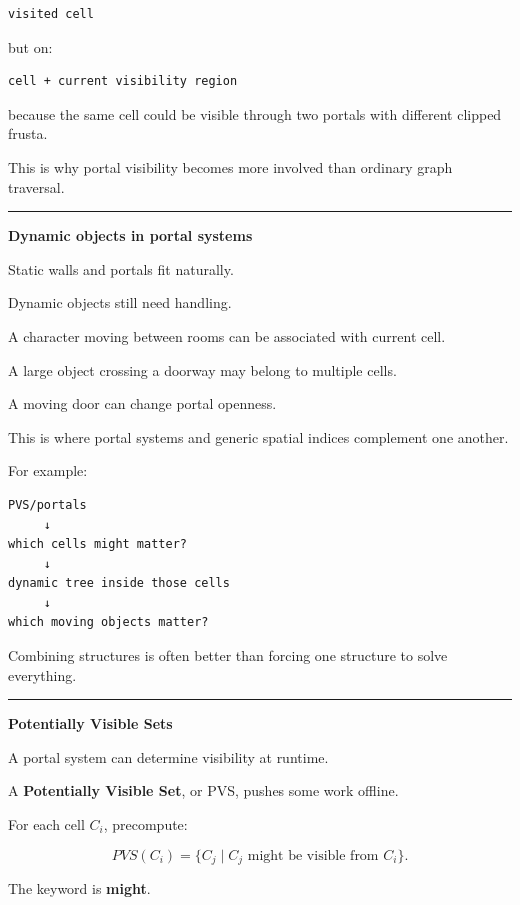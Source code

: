 \begin{verbatim}
visited cell
\end{verbatim}

but on:

\begin{verbatim}
cell + current visibility region
\end{verbatim}

because the same cell could be visible through two portals with different clipped frusta.

This is why portal visibility becomes more involved than ordinary graph traversal.

\begin{center}\rule{0.5\linewidth}{0.5pt}\end{center}

\textbf{Dynamic objects in portal systems}

Static walls and portals fit naturally.

Dynamic objects still need handling.

A character moving between rooms can be associated with current cell.

A large object crossing a doorway may belong to multiple cells.

A moving door can change portal openness.

This is where portal systems and generic spatial indices complement one another.

For example:

\begin{verbatim}
PVS/portals
     ↓
which cells might matter?
     ↓
dynamic tree inside those cells
     ↓
which moving objects matter?
\end{verbatim}

Combining structures is often better than forcing one structure to solve everything.

\begin{center}\rule{0.5\linewidth}{0.5pt}\end{center}

\textbf{Potentially Visible Sets}

A portal system can determine visibility at runtime.

A \textbf{Potentially Visible Set}, or PVS, pushes some work offline.

For each cell \(C_i\), precompute:

\[
PVS(C_i)
=
\{
C_j
\mid
C_j
\text{ might be visible from }C_i
\}.
\]

The keyword is \textbf{might}.

